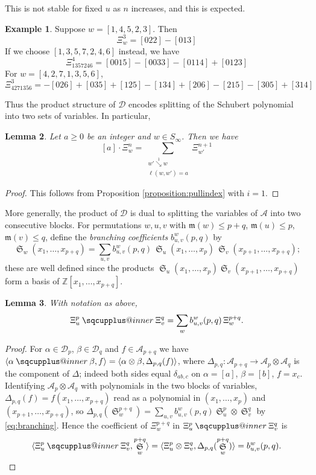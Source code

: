 \documentclass{amsart}
\makeatletter
\newcommand{\sqcupplus@inner}[2]{%
  \vcenter{\hbox{\ooalign{%
    \hfil$\m@th#1\sqcup$\hfil\cr
    \hfil\raisebox{0.15ex}{$\m@th#1\scriptscriptstyle+$}\hfil\cr
  }}}%
}
\newcommand{\sqcupplus}{\mathbin{\mathpalette\sqcupplus@inner\relax}}
\newtheorem{lemma}{Lemma}[subsection]
\theoremstyle{definition}
\newtheorem{example}[lemma]{Example}
\theoremstyle{remark}
\numberwithin{equation}{subsection}
\DeclareMathOperator{\sch}{\mathfrak{S}}
\newcommand{\downvar}[1]{\stackrel{#1}{\searrow}}
\newcommand{\dsch}{\ensuremath{\Xi}}
\newcommand{\coma}{\mathcal{A}}
\newcommand{\dcoma}{\mathcal{D}}
\newcommand{\maxd}{\mathfrak{m}}
\makeatother
\begin{document}
This is not stable for fixed $u$ as $n$ increases, and this is expected.


\begin{example}
Suppose $w = [1,4,5,2,3]$. Then
$$\dsch_w^3 = [022] - [013]$$
If we choose $[1,3,5,7,2,4,6]$ instead, we have
$$\dsch_{1357246}^4 = [0015] - [0033] - [0114] + [0123]$$
For $w=[4,2,7,1,3,5,6]$,
$$\dsch_{4271356}^3 = -[026] + [035] + [125] - [134] + [206] - [215] - [305] + [314]$$
\end{example}

Thus the product structure of $\dcoma$ encodes splitting of the Schubert polynomial into two sets of variables. In particular,
\begin{lemma} \label{lemma:dpieri}
Let $a\geq 0$ be an integer and $w\in S_\infty$. Then we have
$$[a]\cdot \dsch_{w}^{n} = \sum_{\substack{w'\downvar{1} w\\ \ell(w,w')=a}} \dsch_{w'}^{n+1}$$
\end{lemma}
\begin{proof}
  This follows from Proposition \ref{proposition:pullindex} with $i=1$.
\end{proof}

More generally, the product of $\dcoma$ is dual to splitting the variables of $\coma$ into two consecutive blocks. For permutations $w,u,v$ with $\maxd(w)\leq p+q$, $\maxd(u)\leq p$, $\maxd(v)\leq q$, define the \emph{branching coefficients} $b_{u,v}^w(p,q)$ by
\begin{equation}\label{eq:branching}
\sch_w(x_1,\ldots,x_{p+q})=\sum_{u,v}b_{u,v}^w(p,q)\,\sch_u(x_1,\ldots,x_p)\,\sch_v(x_{p+1},\ldots,x_{p+q})\text{;}
\end{equation}
these are well defined since the products $\sch_u(x_1,\ldots,x_p)\sch_v(x_{p+1},\ldots,x_{p+q})$ form a basis of $\mathbb{Z}[x_1,\ldots,x_{p+q}]$.

\begin{lemma}\label{lemma:dualbranch}
With notation as above,
$$\dsch_u^p\sqcupplus\dsch_v^q=\sum_{w}b_{u,v}^w(p,q)\,\dsch_w^{p+q}\text{.}$$
\end{lemma}
\begin{proof}
For $\alpha\in\dcoma_p$, $\beta\in\dcoma_q$ and $f\in\coma_{p+q}$ we have $\langle\alpha\sqcupplus\beta,f\rangle=\langle\alpha\otimes\beta,\Delta_{p,q}(f)\rangle$, where $\Delta_{p,q}:\coma_{p+q}\to\coma_p\otimes\coma_q$ is the component of $\Delta$; indeed both sides equal $\delta_{ab,c}$ on $\alpha=[a]$, $\beta=[b]$, $f=x_c$. Identifying $\coma_p\otimes\coma_q$ with polynomials in the two blocks of variables, $\Delta_{p,q}(f)=f(x_1,\ldots,x_{p+q})$ read as a polynomial in $(x_1,\ldots,x_p)$ and $(x_{p+1},\ldots,x_{p+q})$, so $\Delta_{p,q}(\sch_w^{p+q})=\sum_{u,v}b_{u,v}^w(p,q)\sch_u^p\otimes\sch_v^q$ by \eqref{eq:branching}. Hence the coefficient of $\dsch_w^{p+q}$ in $\dsch_u^p\sqcupplus\dsch_v^q$ is
\[\langle\dsch_u^p\sqcupplus\dsch_v^q,\sch_w^{p+q}\rangle=\langle\dsch_u^p\otimes\dsch_v^q,\Delta_{p,q}(\sch_w^{p+q})\rangle=b_{u,v}^w(p,q)\text{.}\qedhere\]
\end{proof}
\end{document}
